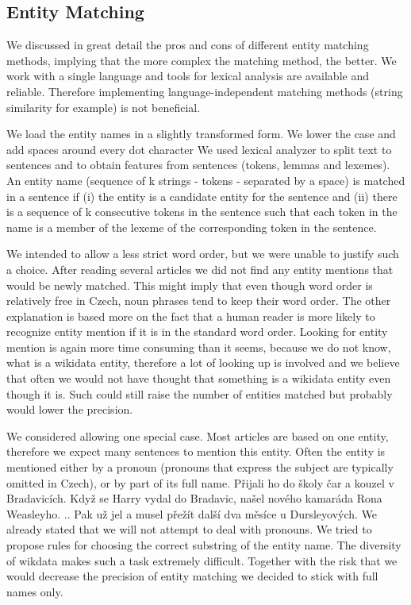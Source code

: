 \subsection{Entity Matching}
\label{sec:entity_matching_implementace}
We discussed in great detail the pros and cons of different entity matching methods, implying that the more complex the matching method, the better. We work with a single language and tools for lexical analysis are available and reliable. Therefore implementing language-independent matching methods (string similarity for example) is not beneficial. 

We load the entity names in a slightly transformed form. We lower the case and add spaces around every dot character We used lexical analyzer to split text to sentences and to obtain features from sentences (tokens, lemmas and lexemes). An entity name (sequence of k strings - tokens - separated by a space) is matched in a sentence if (i) the entity is a candidate entity for the sentence and (ii) there is a sequence of k consecutive tokens in the sentence such that each token in the name is a member of the lexeme of the corresponding token in the sentence. 

We intended to allow a less strict word order, but we were unable to justify such a choice. After reading several articles we did not find any entity mentions that would be newly matched. This might imply that even though word order is relatively free in Czech, noun phrases tend to keep their word order. The other explanation is based more on the fact that a human reader is more likely to recognize entity mention if it is in the standard word order. Looking for entity mention is again more time consuming than it seems, because we do not know, what is a wikidata entity, therefore a lot of looking up is involved and we believe that often we would not have thought that something is a wikidata entity even though it is. Such  could still raise the number of entities matched but probably would lower the precision.

We considered allowing one special case. Most articles are based on one entity, therefore we expect many sentences to mention this entity. Often the entity is mentioned either by a pronoun (pronouns that express the subject are typically omitted in Czech), or by part of its full name.  Přijali ho do školy čar a kouzel v Bradavicích. Když se Harry vydal do Bradavic, našel nového kamaráda Rona Weasleyho. .. Pak už jel  a musel přežít další dva měsíce u Dursleyových. We already stated that we will not attempt to deal with pronouns. We tried to propose rules for choosing the correct substring of the entity name. The diversity of wikdata makes such a task extremely difficult. Together with the risk that we would decrease the precision of entity matching we decided to stick with full names only.

